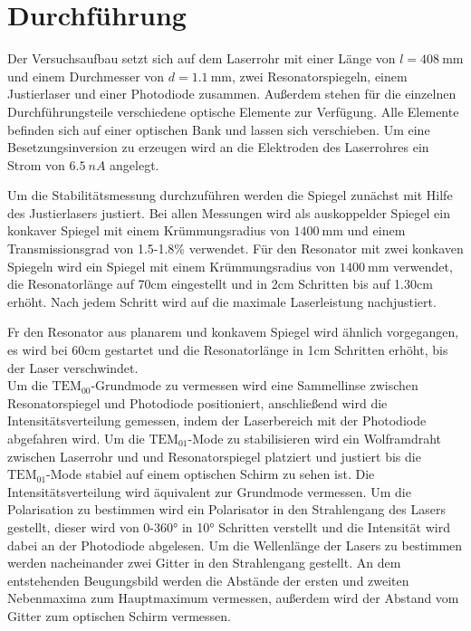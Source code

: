 \section{Durchführung}
\label{sec:Durchführung}
Der Versuchsaufbau setzt sich auf dem Laserrohr mit einer Länge von $l=\SI{408}{\mm}$ und einem
Durchmesser von $d=\SI{1.1}{\mm}$, zwei Resonatorspiegeln, einem Justierlaser
und einer Photodiode zusammen. Außerdem stehen für die einzelnen Durchführungsteile verschiedene
optische Elemente zur Verfügung. Alle Elemente befinden sich auf einer optischen Bank und lassen
sich verschieben. Um eine Besetzungsinversion zu erzeugen wird an die Elektroden des Laserrohres ein
Strom von $\SI{6.5}{nA}$ angelegt.

Um die Stabilitätsmessung durchzuführen werden die Spiegel zunächst mit Hilfe des Justierlasers
justiert. Bei allen Messungen wird als auskoppelder Spiegel ein konkaver Spiegel mit einem Krümmungsradius
von $\SI{1400}{\mm}$ und einem Transmissionsgrad von 1.5-1.8\% verwendet.
Für den Resonator mit zwei konkaven Spiegeln wird ein Spiegel mit einem Krümmungsradius von $\SI{1400}{\mm}$ verwendet,
die Resonatorlänge auf 70\;cm eingestellt
und in 2\;cm Schritten bis auf 1.30\;cm erhöht. Nach jedem Schritt wird auf die maximale Laserleistung nachjustiert.

Fr den Resonator aus planarem und konkavem Spiegel wird ähnlich vorgegangen, es wird bei 60\;cm gestartet und die
Resonatorlänge in 1\;cm Schritten erhöht, bis der Laser verschwindet.\\
Um die $\text{TEM}_{00}$-Grundmode zu vermessen wird eine Sammellinse zwischen Resonatorspiegel und Photodiode
positioniert, anschließend wird die Intensitätsverteilung gemessen, indem der Laserbereich mit der Photodiode
abgefahren wird. Um die $\text{TEM}_{01}$-Mode zu stabilisieren wird ein Wolframdraht zwischen Laserrohr und
und Resonatorspiegel platziert und justiert bis die $\text{TEM}_{01}$-Mode stabiel auf einem optischen Schirm zu sehen ist.
Die Intensitätsverteilung wird äquivalent zur Grundmode vermessen.
Um die Polarisation zu bestimmen wird ein Polarisator in den Strahlengang des Lasers gestellt, dieser wird von
0-360° in 10° Schritten verstellt und die Intensität wird dabei an der Photodiode abgelesen.
Um die Wellenlänge der Lasers zu bestimmen werden nacheinander zwei Gitter in den Strahlengang gestellt.
An dem entstehenden Beugungsbild werden die Abstände der ersten und zweiten Nebenmaxima zum Hauptmaximum vermessen,
außerdem wird der Abstand vom Gitter zum optischen Schirm vermessen.
